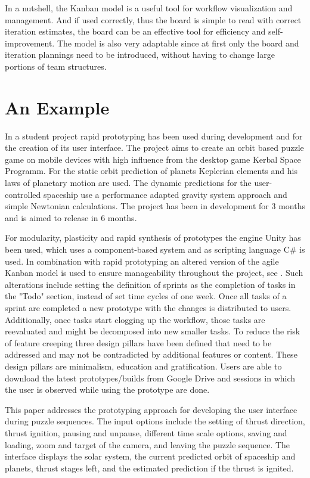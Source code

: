 \documentclass[runningheads]{llncs}
\begin{document}
In a nutshell, the Kanban model is a useful tool for workflow visualization and management. And if used correctly, thus the board is simple to read 
with correct iteration estimates, the board can be an effective tool for efficiency and self-improvement. The model is also very adaptable 
since at first only the board and iteration plannings need to be introduced, without having to change large portions of team structures.


\section{An Example}
In a student project\cite{ref_planeter} rapid prototyping has been used during development and for the creation of its user interface. 
The project aims to create an orbit based puzzle game on mobile devices with high influence from the desktop game 
Kerbal Space Programm. For the static orbit prediction of planets Keplerian elements and his laws of planetary motion
are used. The dynamic predictions for the user-controlled spaceship use a performance adapted gravity system approach
and simple Newtonian calculations. The project has been in development for 3 months and is aimed to release in 6 months.

For modularity, plasticity and rapid synthesis of prototypes the engine Unity has been used, which uses a component-based system 
and as scripting language C\# is used. In combination with rapid prototyping an altered version of the agile Kanban\cite{ref_kanban} model 
is used to ensure manageability throughout the project, see . Such alterations include setting the definition of sprints 
as the completion of tasks in the "Todo" section, instead of set time cycles of one week. 
Once all tasks of a sprint are completed a new prototype with the changes is distributed to users.
Additionally, once tasks start clogging up the workflow, those tasks are reevaluated and might be decomposed into new smaller tasks.
To reduce the risk of feature creeping three design pillars have been defined that need to be addressed and may not be contradicted by additional features or content. These design pillars are minimalism, education and gratification. Users are able to 
download the latest prototypes/builds from Google Drive\cite{ref_planeterProtos} and sessions in which the user is observed while using the prototype are done.

This paper addresses the prototyping approach for developing the user interface during puzzle sequences.
The input options include the setting of thrust direction, thrust ignition, pausing and unpause, different 
time scale options, saving and loading, zoom and target of the camera, and leaving the puzzle sequence.
The interface displays the solar system, the current predicted orbit of spaceship and planets, thrust stages left, and the 
estimated prediction if the thrust is ignited.
\end{document}
